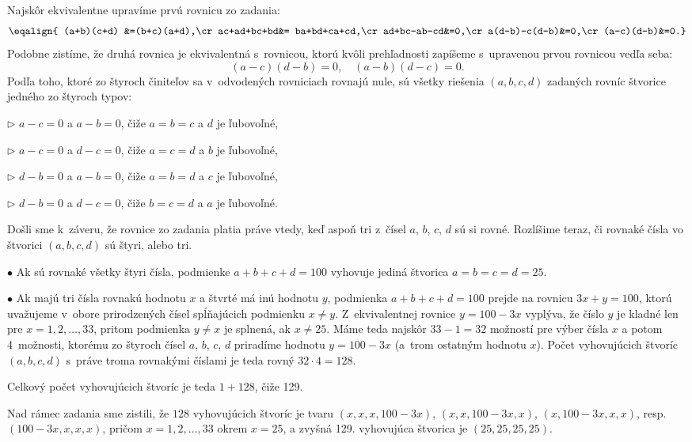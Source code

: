 {%
Najskôr ekvivalentne upravíme prvú rovnicu zo zadania:
$$\eqalign{
(a+b)(c+d) &=(b+c)(a+d),\cr
ac+ad+bc+bd&= ba+bd+ca+cd,\cr
ad+bc-ab-cd&=0,\cr
a(d-b)-c(d-b)&=0,\cr
(a-c)(d-b)&=0.}
$$
Podobne zistíme, že druhá rovnica je ekvivalentná s~rovnicou,
ktorú kvôli prehľadnosti zapíšeme s~upravenou prvou rovnicou vedľa seba:
$$
(a-c) (d-b) = 0, \quad (a-b) (d-c) = 0.
$$
Podľa toho, ktoré zo štyroch činiteľov sa v~odvodených rovniciach
rovnajú nule, sú všetky riešenia $(a,b,c,d)$ zadaných rovníc
štvorice jedného zo štyroch typov:

\smallskip
\item{$\triangleright$} $a-c=0$ a $a-b=0$, čiže $a=b=c$ a $d$ je ľubovoľné,
\item{$\triangleright$} $a-c=0$ a $d-c=0$, čiže $a=c=d$ a $b$ je ľubovoľné,
\item{$\triangleright$} $d-b=0$ a $a-b=0$, čiže $a=b=d$ a $c$ je ľubovoľné,
\item{$\triangleright$} $d-b=0$ a $d-c=0$, čiže $b=c=d$ a $a$ je ľubovoľné.

\smallskip\noindent
Došli sme k~záveru, že rovnice zo zadania platia práve vtedy, keď
aspoň tri z~čísel $a$, $b$, $c$, $d$ sú si rovné. Rozlíšime
teraz, či rovnaké čísla vo štvorici $(a,b,c,d)$ sú štyri, alebo
tri.

\smallskip
\item{$\bullet$} Ak sú rovnaké všetky štyri čísla, podmienke $a+b+c+d=100$ vyhovuje jediná štvorica $a=b=c=d=25$.
\item{$\bullet$} Ak majú tri čísla rovnakú hodnotu $x$ a štvrté má
inú hodnotu $y$, podmienka $a+b+c+d=100$ prejde na rovnicu
$3x+y=100$, ktorú uvažujeme v~obore prirodzených čísel
spĺňajúcich podmienku $x\ne y$. Z~ekvivalentnej rovnice
$y=100-3x$ vyplýva, že číslo $y$ je kladné
len pre $x=1,2,\ldots,33$, pritom podmienka $y \ne x$ je splnená,
ak $x \ne 25$. Máme teda najskôr $33-1=32$ možností pre výber
čísla $x$ a potom 4~možnosti, ktorému zo štyroch čísel $a$, $b$,
$c$, $d$ priradíme hodnotu $y=100-3x$ (a~trom ostatným hodnotu $x$). Počet vyhovujúcich štvoríc $(a,b,c,d)$
s~práve troma rovnakými číslami je teda rovný $32\cdot4=128$.

\smallskip\noindent
Celkový počet vyhovujúcich štvoríc je teda $1+128$, čiže 129.

Nad rámec zadania sme zistili, že $128$
vyhovujúcich štvoríc je tvaru $(x,x,x,100-3x)$, $(x,x,100-3x,x)$,
$(x,100-3x,x,x)$, resp. $(100-3x,x,x,x)$, pričom
$x=1,2,\ldots,33$ okrem $x=25$, a zvyšná 129.
vyhovujúca štvorica je $(25,25,25,25)$.

}
